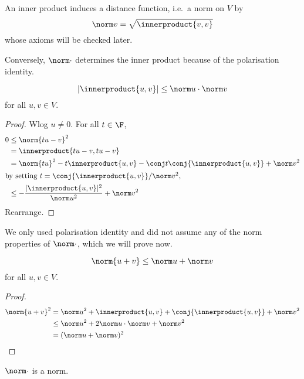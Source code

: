 \documentclass[a4paper]{article}
\newcommand*{\ip}{\innerproduct}
\theoremstyle{definition}
\begin{document}
\begin{remark}
  An inner product induces a distance function, i.e.\ a norm on \(V\) by
  \[
    \norm v = \sqrt{\ip{v, v}}
  \]
  whose axioms will be checked later.
  
  Conversely, \(\norm \cdot\) determines the inner product because of the polarisation identity.
\end{remark}

\begin{lemma}
  \[
    |\ip{u, v}| \leq \norm u \cdot \norm v
  \]
  for all \(u, v \in V\).
\end{lemma}

\begin{proof}
  Wlog \(u \neq 0\). For all \(t \in \F\),
  \begin{align*}
    0 &\leq \norm{tu - v}^2 \\
      &= \ip{tu - v, tu - v} \\
      &= \norm{tu}^2 - t \ip{u, v} - \conj t \conj{\ip{u, v}} + \norm v^2 \\
    \intertext{by setting \(t = \conj{\ip{u, v}}/\norm v^2\),}
      &\leq - \frac{|\ip{u, v}|^2}{\norm u^2} + \norm v^2
  \end{align*}
  Rearrange.
\end{proof}

\begin{note}
  We only used polarisation identity and did not assume any of the norm properties of \(\norm \cdot\), which we will prove now.
\end{note}

\begin{corollary}
  \[
    \norm{u + v} \leq \norm u + \norm v
  \]
  for all \(u, v \in V\).
\end{corollary}

\begin{proof}
  \begin{align*}
    \norm{u + v}^2 &= \norm u^2 + \ip{u, v} + \conj{\ip{u, v}} + \norm v^2 \\
                   &\leq \norm u^2 + 2 \norm u \cdot \norm v + \norm v^2 \\
                   &= (\norm u + \norm v)^2
  \end{align*}
\end{proof}

\begin{corollary}
  \(\norm \cdot\) is a norm.
\end{corollary}
\end{document}
